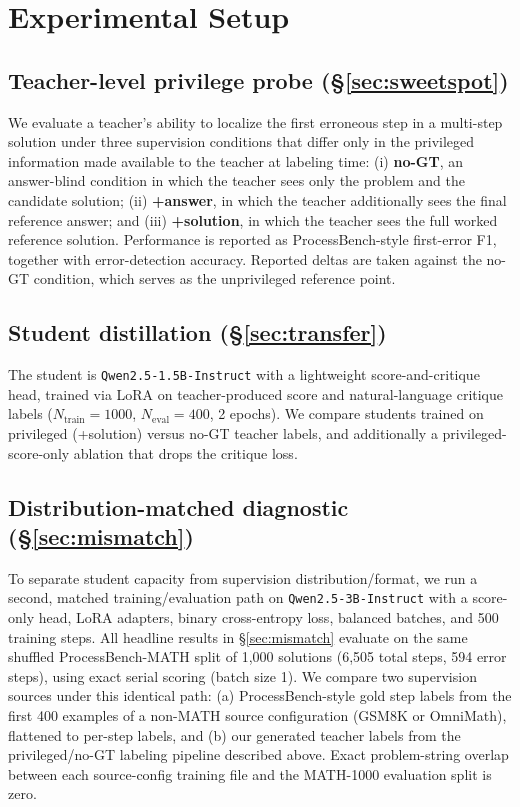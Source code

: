 \documentclass{article}
\begin{document}
\section{Experimental Setup}
\label{sec:setup}

\subsection{Teacher-level privilege probe (\S\ref{sec:sweetspot})}
We evaluate a teacher's ability to localize the first erroneous step in a
multi-step solution under three supervision conditions that differ only in
the privileged information made available to the teacher at labeling time:
(i) \textbf{no-GT}, an answer-blind condition in which the teacher sees only
the problem and the candidate solution; (ii) \textbf{+answer}, in which the
teacher additionally sees the final reference answer; and (iii)
\textbf{+solution}, in which the teacher sees the full worked reference
solution. Performance is reported as ProcessBench-style first-error F1,
together with error-detection accuracy. Reported deltas are taken against the
no-GT condition, which serves as the unprivileged reference point.

\subsection{Student distillation (\S\ref{sec:transfer})}
The student is \texttt{Qwen2.5-1.5B-Instruct} with a lightweight
score-and-critique head, trained via LoRA on teacher-produced score and
natural-language critique labels ($N_\text{train}=1000$,
$N_\text{eval}=400$, 2 epochs). We compare students trained on privileged
(+solution) versus no-GT teacher labels, and additionally a
privileged-score-only ablation that drops the critique loss.

\subsection{Distribution-matched diagnostic (\S\ref{sec:mismatch})}
To separate student capacity from supervision distribution/format, we run a
second, matched training/evaluation path on \texttt{Qwen2.5-3B-Instruct}
with a score-only head, LoRA adapters, binary cross-entropy loss, balanced
batches, and 500 training steps. All headline results in
\S\ref{sec:mismatch} evaluate on the same shuffled ProcessBench-MATH split
of 1{,}000 solutions (6{,}505 total steps, 594 error steps), using exact
serial scoring (batch size 1). We compare two supervision sources under this
identical path: (a) ProcessBench-style gold step labels from the first 400
examples of a non-MATH source configuration (GSM8K or OmniMath), flattened
to per-step labels, and (b) our generated teacher labels from the
privileged/no-GT labeling pipeline described above. Exact problem-string
overlap between each source-config training file and the MATH-1000
evaluation split is zero.
\end{document}
